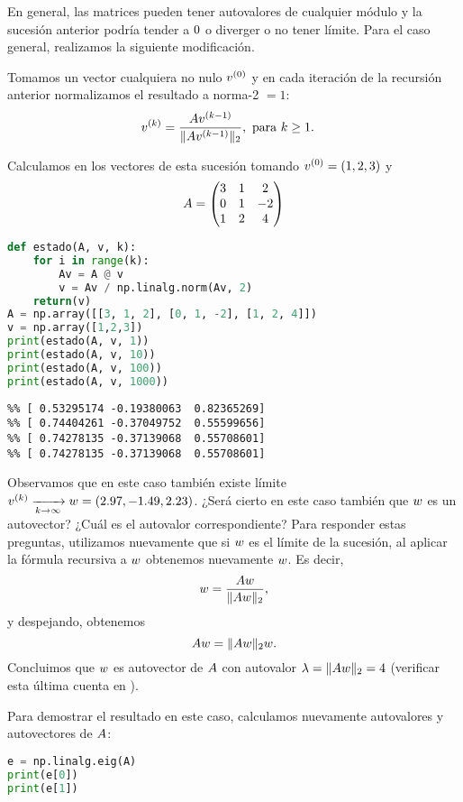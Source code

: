 En general, las matrices pueden tener autovalores de cualquier módulo y la sucesión anterior podría tender a $\cero$ o diverger o no tener límite. Para el caso general, realizamos la siguiente modificación.

Tomamos un vector cualquiera no nulo $\vb^{(0)}$ y en cada iteración de la recursión anterior normalizamos el resultado a norma-2 $= 1$:
$$
\begin{aligned}
\vb^{(k)} &= \frac{\Ab \vb^{(k-1)}}{\|\Ab\vb^{(k-1)}\|_2}, \text{ para } k \ge 1.
\end{aligned}
$$

Calculamos en \python los vectores de esta sucesión tomando $\vb^{(0)} = (1, 2, 3)$ y
$$
\Ab = \begin{pmatrix}
3 & 1 & 2 \\
0 & 1 & -2 \\
1 & 2 & 4
\end{pmatrix}
$$


\begin{Shaded}
\begin{lstlisting}[language=python]
def estado(A, v, k):
    for i in range(k):
        Av = A @ v
        v = Av / np.linalg.norm(Av, 2)
    return(v)
A = np.array([[3, 1, 2], [0, 1, -2], [1, 2, 4]])
v = np.array([1,2,3])
print(estado(A, v, 1))
print(estado(A, v, 10))
print(estado(A, v, 100))
print(estado(A, v, 1000))
\end{lstlisting}
\end{Shaded}

\begin{verbatim}
%% [ 0.53295174 -0.19380063  0.82365269]
%% [ 0.74404261 -0.37049752  0.55599656]
%% [ 0.74278135 -0.37139068  0.55708601]
%% [ 0.74278135 -0.37139068  0.55708601]
\end{verbatim}

Observamos que en este caso también existe límite $\vb^{(k)} \xrightarrow[k \rightarrow \infty]{} \wb = (2.97, -1.49,  2.23)$. ¿Será cierto en este caso también que $\wb$ es un autovector? ¿Cuál es el autovalor correspondiente? Para responder estas preguntas, utilizamos nuevamente que si $\wb$ es el l\'imite de la sucesión, al aplicar la fórmula recursiva a $\wb$ obtenemos nuevamente $\wb$. Es decir,
$$
\wb = \frac{\Ab \wb}{\|\Ab \wb\|_2},
$$
y despejando, obtenemos
$$
\Ab \wb = \|\Ab \wb\|_2 \wb.
$$
Concluimos que $\wb$ es autovector de $\Ab$ con autovalor $\lambda = \|\Ab \wb\|_2 = 4$ (verificar esta última cuenta en \python).

Para demostrar el resultado en este caso, calculamos nuevamente autovalores y autovectores de $\Ab$:
\begin{Shaded}
\begin{lstlisting}[language=python]
e = np.linalg.eig(A)
print(e[0])
print(e[1])
\end{lstlisting}
\end{Shaded}

